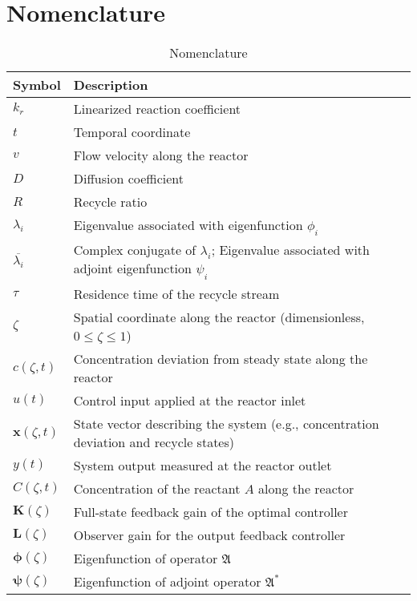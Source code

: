\newpage
\section*{Nomenclature}
\begin{table}[ht]
\centering
\caption{Nomenclature}
\begin{tabular}{ll}
\toprule
\textbf{Symbol} & \textbf{Description} \\
\midrule
$k_r$ & Linearized reaction coefficient \\
$t$ & Temporal coordinate \\
$v$ & Flow velocity along the reactor \\
$D$ & Diffusion coefficient \\
$R$ & Recycle ratio \\
$\lambda_i$ & Eigenvalue associated with eigenfunction $\phi_i$ \\
$\overline{\lambda_i}$ & Complex conjugate of $\lambda_i$; Eigenvalue associated with adjoint eigenfunction $\psi_i$ \\
$\tau$ & Residence time of the recycle stream \\
$\zeta$ & Spatial coordinate along the reactor (dimensionless, $0 \leq \zeta \leq 1$) \\

$c(\zeta, t)$ & Concentration deviation from steady state along the reactor \\
$u(t)$ & Control input applied at the reactor inlet \\
$\bm{x}(\zeta, t)$ & State vector describing the system (e.g., concentration deviation and recycle states) \\
$y(t)$ & System output measured at the reactor outlet \\
$C(\zeta, t)$ & Concentration of the reactant $A$ along the reactor \\
$\bm{K}(\zeta)$ & Full-state feedback gain of the optimal controller \\
$\bm{L}(\zeta)$ & Observer gain for the output feedback controller \\
$\bm{\phi}(\zeta)$ & Eigenfunction of operator $\mathfrak{A}$ \\
$\bm{\psi}(\zeta)$ & Eigenfunction of adjoint operator $\mathfrak{A}^*$ \\


\end{tabular}
\end{table}
